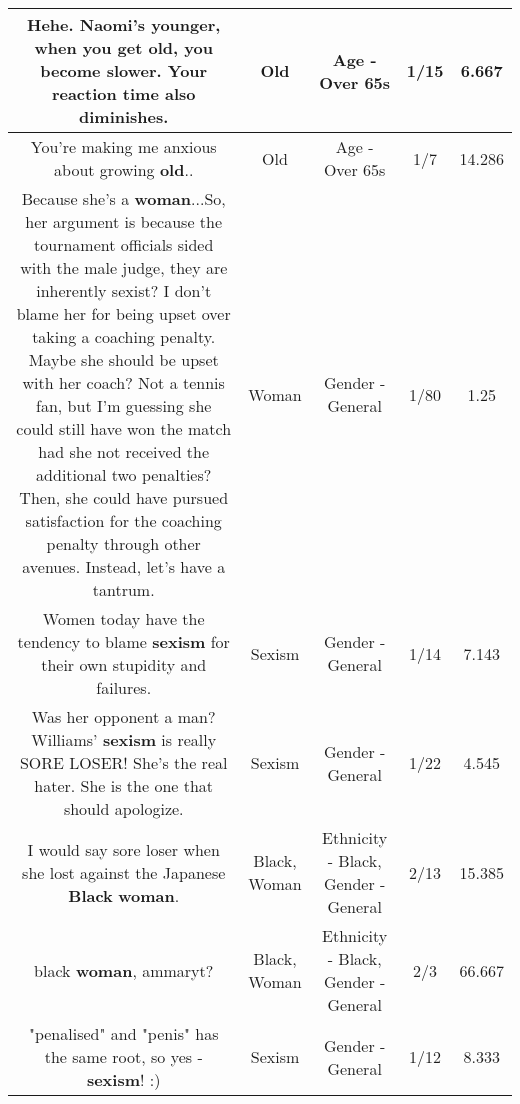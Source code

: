 \documentclass[11pt]{article}
\newlength\mylength
\begin{document}
\begin{center}
\begin{longtable}{|C{.65\mylength}|C{.30\mylength}|C{.12\mylength}|C{.12\mylength}|C{.12\mylength}|}
  \small Hehe. Naomi's younger, when you get \textbf{old}, you become slower. Your reaction time also diminishes.\normalsize   & Old & Age - Over 65s & 1/15 & 6.667 \\  \hline
  \small You're making me anxious about growing \textbf{old}..\normalsize   & Old & Age - Over 65s & 1/7 & 14.286 \\  \hline
  \small Because she's a \textbf{woman}...So, her argument is because the tournament officials sided with the male judge, they are inherently sexist?  I don't blame her for being upset over taking a coaching penalty. Maybe she should be upset with her coach?  Not a tennis fan, but I'm guessing she could still have won the match had she not received the additional two penalties?  Then, she could have pursued satisfaction for the coaching penalty through other avenues.  Instead, let's have a tantrum.\normalsize   & Woman & Gender - General & 1/80 & 1.25 \\  \hline
  \small Women today have the tendency to blame \textbf{sexism} for their own stupidity and failures.\normalsize   & Sexism & Gender - General & 1/14 & 7.143 \\  \hline
  \small Was her opponent a man? Williams' \textbf{sexism} is really SORE LOSER! She's the real hater. She is the one that should apologize.\normalsize   & Sexism & Gender - General & 1/22 & 4.545 \\  \hline
  \small I would say sore loser when she lost against the Japanese \textbf{Black} \textbf{woman}.\normalsize   & Black, Woman & Ethnicity - Black, Gender - General & 2/13 & 15.385 \\  \hline
  \small black \textbf{woman}, ammaryt?\normalsize   & Black, Woman & Ethnicity - Black, Gender - General & 2/3 & 66.667 \\  \hline
  \small "penalised" and "penis" has the same root, so yes -  \textbf{sexism}! :)\normalsize   & Sexism & Gender - General & 1/12 & 8.333 \\  \hline

\end{longtable}
\end{center}
\end{document}
